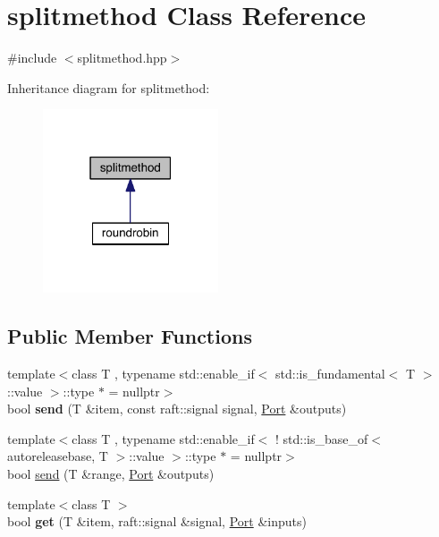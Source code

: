 \hypertarget{classsplitmethod}{}\section{splitmethod Class Reference}
\label{classsplitmethod}


{\ttfamily \#include $<$splitmethod.\+hpp$>$}



Inheritance diagram for splitmethod\+:
\nopagebreak
\begin{figure}[H]
\begin{center}
\leavevmode
\includegraphics[width=147pt]{classsplitmethod__inherit__graph}
\end{center}
\end{figure}
\subsection*{Public Member Functions}
\begin{DoxyCompactItemize}
\item 
\hypertarget{classsplitmethod_a8ccafddc675963367cbff3939373e7b8}{}\label{classsplitmethod_a8ccafddc675963367cbff3939373e7b8} 
{\footnotesize template$<$class T , typename std\+::enable\+\_\+if$<$ std\+::is\+\_\+fundamental$<$ T $>$\+::value $>$\+::type $\ast$  = nullptr$>$ }\\bool {\bfseries send} (T \&item, const raft\+::signal signal, \hyperlink{class_port}{Port} \&outputs)
\item 
{\footnotesize template$<$class T , typename std\+::enable\+\_\+if$<$ ! std\+::is\+\_\+base\+\_\+of$<$ autoreleasebase, T $>$\+::value $>$\+::type $\ast$  = nullptr$>$ }\\bool \hyperlink{classsplitmethod_af9067e627d58d344cd1b11bc9d3e92d6}{send} (T \&range, \hyperlink{class_port}{Port} \&outputs)
\item 
\hypertarget{classsplitmethod_a72e3c5295001d5370c19d56b7ed1d07a}{}\label{classsplitmethod_a72e3c5295001d5370c19d56b7ed1d07a} 
{\footnotesize template$<$class T $>$ }\\bool {\bfseries get} (T \&item, raft\+::signal \&signal, \hyperlink{class_port}{Port} \&inputs)
\end{DoxyCompactItemize}
